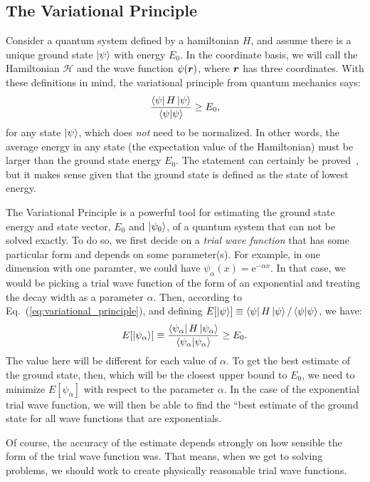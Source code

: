 \documentclass[12pt]{article}
\newcommand{\e}{\mathrm{e}}
\numberwithin{equation}{section}
\begin{document}
\subsection{The Variational Principle}
Consider a quantum system defined by a hamiltonian $H$, and assume there is a unique ground state $\ket{\psi}$ with energy $E_0$.  In the coordinate basis, we will call the Hamiltonian $\mathcal H$ and the wave function $\psi(\vb*{r})$, where $\vb*r$ has three coordinates.  With these definitions in mind, the variational principle from quantum mechanics says:
\begin{equation}
    \label{eq:variational_principle}
    \frac{\bra\psi H \ket\psi}{\braket{\psi}{\psi}} \geq E_0,
\end{equation}
for any state $\ket\psi$, which does \textit{not} need to be normalized.  In other words, the average energy in any state (the expectation value of the Hamiltonian) must be larger than the ground state energy $E_0$.  The statement can certainly be proved~\cite{shankar_2014}, but it makes sense given that the ground state is defined as the state of lowest energy.

The Variational Principle is a powerful tool for estimating the ground state energy and state vector, $E_0$ and $\ket{\psi_0}$, of a quantum system that can not be solved exactly. To do so, we first decide on a \textit{trial wave function} that has some particular form and depends on some parameter(s).  For example, in one dimension with one paramter, we could have $\psi_\alpha(x) = \e ^{-\alpha x}$. In that case, we would be picking a trial wave function of the form of an exponential and treating the decay width as a parameter $\alpha$. Then, according to Eq.~(\ref{eq:variational_principle}), and defining $E[\ket\psi] \equiv \bra\psi H \ket\psi / \braket{\psi}{\psi}$, we have:
\begin{equation}
    E[\ket{\psi_\alpha}] \equiv \frac{\bra{\psi_\alpha} H \ket{\psi_\alpha}}{\braket{\psi_\alpha}{\psi_\alpha}} \geq E_0.
\end{equation}
The value here will be different for each value of $\alpha$.  To get the best estimate of the ground state, then, which will be the closest upper bound to $E_0$, we need to minimize $E[\psi_\alpha]$ with respect to the parameter $\alpha$.  In the case of the exponential trial wave function, we will then be able to find the ``best estimate of the ground state for all wave functions that are exponentials.

Of course, the accuracy of the estimate depends strongly on how sensible the form of the trial wave function was.  That means, when we get to solving problems, we should work to create physically reasonable trial wave functions.
\end{document}
